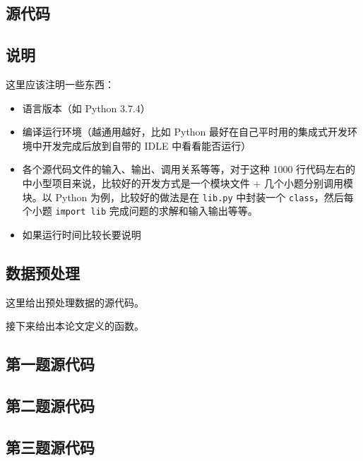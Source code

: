 \documentclass{cumcmthesis}
\begin{document}
\newpage
\begin{appendices}


\section{源代码}
\subsection{说明}
这里应该注明一些东西：
\begin{itemize}
	\item 语言版本（如 Python 3.7.4）
	\item 编译运行环境（越通用越好，比如 Python 最好在自己平时用的集成式开发环境中开发完成后放到自带的 IDLE 中看看能否运行）
	\item 各个源代码文件的输入、输出、调用关系等等，对于这种 1000 行代码左右的中小型项目来说，比较好的开发方式是一个模块文件 + 几个小题分别调用模块。以 Python 为例，比较好的做法是在 \verb|lib.py| 中封装一个 \verb|class|，然后每个小题 \verb|import lib| 完成问题的求解和输入输出等等。
	\item 如果运行时间比较长要说明
\end{itemize}

\subsection{数据预处理}

这里给出预处理数据的源代码。




接下来给出本论文定义的函数。



\subsection{第一题源代码}


\subsection{第二题源代码}
\subsection{第三题源代码}
\end{appendices}
\end{document}
